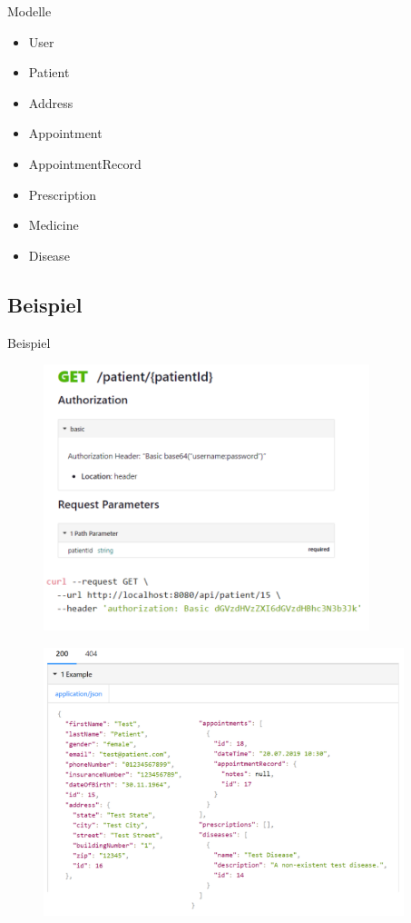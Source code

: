 \documentclass{beamer}
\begin{document}
\begin{frame}{Modelle}
  
  \begin{itemize}
    \item User
    \item Patient
    \item Address
    \item Appointment
    \item AppointmentRecord
    \item Prescription
    \item Medicine
    \item Disease
  \end{itemize}
  
\end{frame}


\subsection{Beispiel}

\begin{frame}{Beispiel}
  
  \begin{figure}
    \includegraphics[width=95mm]{GET.png}
  \end{figure}
  
\end{frame}

\begin{frame}
  
  \begin{figure}
    \includegraphics[width=105mm]{GET_RES.png}
  \end{figure}
  
\end{frame}
\end{document}
